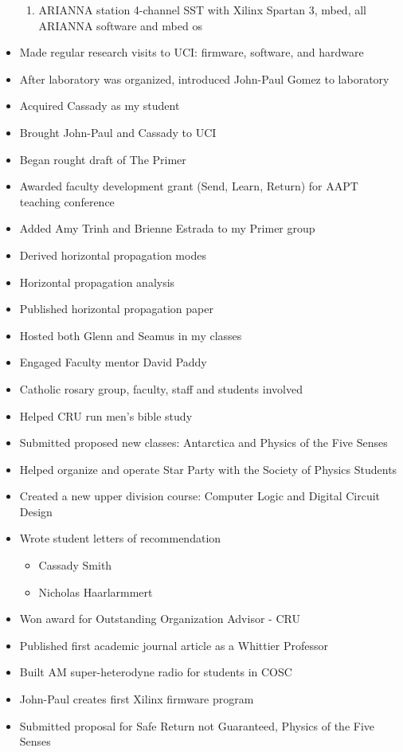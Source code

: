 \begin{itemize}
\begin{enumerate}
\item ARIANNA station 4-channel SST with Xilinx Spartan 3, mbed, all ARIANNA software and mbed os
\end{enumerate}
\item Made regular research visits to UCI: firmware, software, and hardware
\item After laboratory was organized, introduced John-Paul Gomez to laboratory
\item Acquired Cassady as my student
\item Brought John-Paul and Cassady to UCI
\item Began rought draft of The Primer
\item Awarded faculty development grant (Send, Learn, Return) for AAPT teaching conference
\item Added Amy Trinh and Brienne Estrada to my Primer group
\item Derived horizontal propagation modes
\item Horizontal propagation analysis
\item Published horizontal propagation paper
\item Hosted both Glenn and Seamus in my classes
\item Engaged Faculty mentor David Paddy
\item Catholic rosary group, faculty, staff and students involved
\item Helped CRU run men's bible study
\item Submitted proposed new classes: Antarctica and Physics of the Five Senses
\item Helped organize and operate Star Party with the Society of Physics Students
\item Created a new upper division course: Computer Logic and Digital Circuit Design
\item Wrote student letters of recommendation
\begin{itemize}
\item Cassady Smith
\item Nicholas Haarlarmmert
\end{itemize}
\item Won award for Outstanding Organization Advisor - CRU
\item Published first academic journal article as a Whittier Professor
\item Built AM super-heterodyne radio for students in COSC
\item John-Paul creates first Xilinx firmware program
\item Submitted proposal for Safe Return not Guaranteed, Physics of the Five Senses

\end{itemize}
